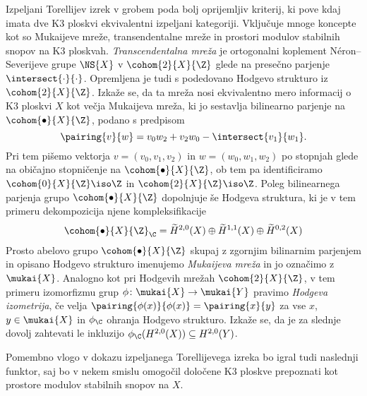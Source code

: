 Izpeljani Torellijev izrek v grobem poda bolj oprijemljiv kriterij, ki pove kdaj imata dve K3 ploskvi ekvivalentni izpeljani kategoriji.
Vključuje mnoge koncepte kot so Mukaijeve mreže, transendentalne mreže in prostori modulov stabilnih snopov na K3 ploskvah. \emph{Transcendentalna mreža} je ortogonalni koplement Néron--Severijeve grupe $\NS{X}$ v $\cohom{2}{X}{\Z}$ glede na presečno parjenje $\intersect{\cdot}{\cdot}$. Opremljena je tudi s podedovano Hodgevo strukturo iz $\cohom{2}{X}{\Z}$. Izkaže se, da ta mreža nosi ekvivalentno mero informacij o K3 ploskvi $X$ kot večja Mukaijeva mreža, ki jo sestavlja bilinearno parjenje na $\cohom{\bullet}{X}{\Z}$, podano s predpisom 
\[
    \pairing{v}{w} = v_0w_2 + v_2w_0 - \intersect{v_1}{w_1}.
\]
Pri tem pišemo vektorja $v = (v_0, v_1, v_2)$ in $w = (w_0, w_1, w_2)$ po stopnjah glede na običajno stopničenje na $\cohom{\bullet}{X}{\Z}$, ob tem pa identificiramo $\cohom{0}{X}{\Z} \iso \Z$ in $\cohom{2}{X}{\Z} \iso \Z$. Poleg bilinearnega parjenja grupo $\cohom{\bullet}{X}{\Z}$ dopolnjuje še Hodgeva struktura, ki je v tem primeru dekompozicija njene kompleksifikacije
\[
    \cohom{\bullet}{X}{\Z}_\C = \widetilde{H}^{2,0}(X) \oplus \widetilde{H}^{1,1}(X) \oplus \widetilde{H}^{0,2}(X)
\]
Prosto abelovo grupo $\cohom{\bullet}{X}{\Z}$ skupaj z zgornjim bilinarnim parjenjem in opisano Hodgevo strukturo imenujemo \emph{Mukaijeva mreža} in jo označimo z $\mukai{X}$. Analogno kot pri Hodgevih mrežah $\cohom{2}{X}{\Z}$, v tem primeru izomorfizmu grup ${\phi \colon \mukai{X} \to \mukai{Y}}$ pravimo \emph{Hodgeva izometrija}, če velja $\pairing{\phi(x)}{\phi(x)} = \pairing{x}{y}$ za vse $x$, $y \in \mukai{X}$ in $\phi_\C$ ohranja Hodgevo strukturo. Izkaže se, da je za slednje dovolj zahtevati le inkluzijo $\phi_\C(H^{2,0}(X)) \subseteq H^{2,0}(Y)$.

Pomembno vlogo v dokazu izpeljanega Torellijevega izreka bo igral tudi naslednji funktor, saj bo v nekem smislu omogočil določene K3 ploskve prepoznati kot prostore modulov stabilnih snopov na $X$.

